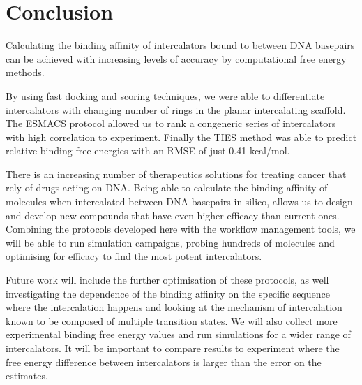 \section{Conclusion}

Calculating the binding affinity of intercalators bound to between DNA basepairs can be achieved with increasing levels of accuracy by computational free energy methods. 

By using fast docking and scoring techniques, we were able to differentiate intercalators with changing number of rings in the planar intercalating scaffold. The ESMACS protocol allowed us to rank a congeneric series of intercalators with high correlation to experiment. Finally the TIES method was able to predict relative binding free energies with an RMSE of just 0.41 kcal/mol. 

There is an increasing number of therapeutics solutions for treating cancer that rely of drugs acting on DNA. Being able to calculate the binding affinity of molecules when intercalated between DNA basepairs in silico, allows us to design and develop new compounds that have even higher efficacy than current ones. Combining the protocols developed here with the workflow management tools, we will be able to run simulation campaigns, probing hundreds of molecules and optimising for efficacy to find the most potent intercalators.

Future work will include the further optimisation of these protocols, as well investigating the dependence of the binding affinity on the specific sequence where the intercalation happens and looking at the mechanism of intercalation known to be composed of multiple transition states. We will also collect more experimental binding free energy values and run simulations for a wider range of intercalators. It will be important to compare results to experiment where the free energy difference between intercalators is larger than the error on the estimates. 
